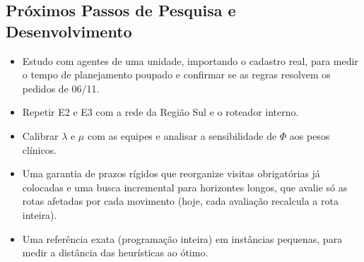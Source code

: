 \documentclass[11pt,a4paper]{article}
\begin{document}
\subsection{Próximos Passos de Pesquisa e Desenvolvimento}
\begin{itemize}
    \item Estudo com agentes de uma unidade, importando o cadastro real, para medir o tempo de planejamento poupado e confirmar se as regras resolvem os pedidos de 06/11.
    \item Repetir E2 e E3 com a rede da Região Sul e o roteador interno.
    \item Calibrar $\lambda$ e $\mu$ com as equipes e analisar a sensibilidade de $\Phi$ aos pesos clínicos.
    \item Uma garantia de prazos rígidos que reorganize visitas obrigatórias já colocadas e uma busca incremental para horizontes longos, que avalie só as rotas afetadas por cada movimento (hoje, cada avaliação recalcula a rota inteira).
    \item Uma referência exata (programação inteira) em instâncias pequenas, para medir a distância das heurísticas ao ótimo.
\end{itemize}
\end{document}
